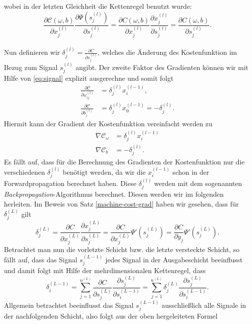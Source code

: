 wobei in der letzten Gleichheit die Kettenregel benutzt wurde:
\[
    \frac{\partial \mathcal{C}(\omega,b)}{\partial x_j^{(l)}} \frac{\partial \Psi(s_j^{(l)})}{\partial s_j^{(l)}}
    = \frac{\partial C(\omega,b)}{\partial x_j^{(l)}} \frac{\partial x_j^{(l)}}{\partial s_j^{(l)}}
    = \frac{\partial C(\omega,b)}{\partial s_j^{(l)}}.
\]
\qedwhite\\
Nun definieren wir $\delta_j^{(l)}=\frac{\partial C}{\partial s_{j}^{(l)}}$, welches die Änderung des Kostenfunktion im Bezug zum Signal
$s_j^{(l)}$ angibt. Der zweite Faktor des Gradienten können wir mit Hilfe von \eqref{eq:signal} explizit ausgerechne und
somit folgt
\begin{align*}
    \frac{\partial \mathcal{C}}{\partial \omega_{ij}^{(l)}} &= \delta_j^{(l)} x_i^{(l-1)}, \\
    \frac{\partial \mathcal{C}}{\partial b_j^{(l)}} &= \delta_j^{(l)} x_{0}^{(l-1)} = -\delta_j^{(l)}.
\end{align*}
Hiermit kann der Gradient der Kostenfunktion vereinfacht werden zu
\begin{align*}
    \nabla \mathcal{C}_{\omega}&=\delta_j^{(l)}x_i^{(l-1)} \\
    \nabla \mathcal{C}_{b}&=-\delta_j^{(l)}.
\end{align*}
Es fällt auf, dass für die Berechnung des Gradienten der Kostenfunktion nur die verschiedenen $\delta_j^{(l)}$ benötigt
werden, da wir die $x_i^{(l-1)}$ schon in der Forwardpropagation berechnet haben. Diese $\delta_j^{(l)}$ werden mit dem
sogenannten \textit{Backpropagation}-Algorithmus berechnet. Diesen werden wir im folgenden herleiten. Im Beweis
von Satz \eqref{machine-cost-grad} haben wir gesehen, dass für $\delta_j^{(L)}$ gilt
\[
    \delta_j^{(L)}= \frac{\partial C}{\partial x_j^{(L)}} \frac{\partial x_j^{(L)}}{\partial s_j^{(L)}}= \frac{\partial C}{\partial x_j^{(L)}} \Psi '(s_j^{(L)})
    =\frac{\partial C}{\partial y_j} \Psi '(s_j^{(L)}).
\]
Betrachtet man nun die vorletzte Schicht bzw. die letzte versteckte Schicht, so fällt auf, dass das Signal
$s_j^{(L-1)}$ jedes Signal in der Ausgabeschicht beeinflusst und damit folgt mit Hilfe der mehrdimensionalen
Kettenregel, dass
\[
    \delta_i^{(L-1)}= \sum\limits_{j=1}^{n^{(L)}} \frac{\partial C}{\partial s_j^{(L)}}
    \frac{\partial s_j^{(L)}}{\partial s_i^{(L-1)}}
    = \sum\limits_{j=1}^{n^{(L)}} \delta_j^{(L)} \frac{\partial s_j^{(L)}}{\partial s_i^{(L-1)}}.
\]
Allgemein betrachtet beeinflusst das Signal $s_j^{(L-1)}$ ausschließlich alle Signale in der nachfolgenden Schicht,
also folgt aus der oben hergeleiteten Formel

